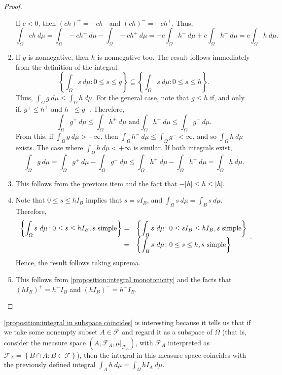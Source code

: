 \begin{proof}
\begin{enumerate}
		If \(c<0\), then \((ch)^+=-ch^-\) and \((ch)^-=-ch^+\). Thus, 
		\[\int_{\Omega}ch~d\mu=\int_{\Omega}-ch^-~d\mu-\int_{\Omega}-ch^+~d\mu=-c\int_{\Omega}h^-~d\mu+c\int_{\Omega}h^+~d\mu=c\int_{\Omega}h~d\mu.\]
		\item If \(g\) is nonnegative, then \(h\) is nonnegative too. The result
follows immediately from the definition of the integral:
		\[\left\{\int_{\Omega}s~d\mu\colon 0\leq s\leq g\right\}\subseteq\left\{\int_{\Omega}s~d\mu\colon 0\leq s\leq h\right\}.\]
Thus, \(\int_{\Omega}g~d\mu\leq\int_{\Omega}h~d\mu.\) For the general case, note
that \(g\leq h\) if, and only if, \(g^+\leq h^+\) and \(h^-\leq g^-\).
Therefore,
		\[\int_{\Omega}g^+~d\mu\leq\int_{\Omega}h^+~d\mu\text{ and
}\int_{\Omega}h^-~d\mu\leq\int_{\Omega}g^-~d\mu.\] From this, if
\(\int_{\Omega}g~d\mu>-\infty\), then
\(\int_{\Omega}h^-~d\mu\leq \int_{\Omega}g^-<\infty\), and so
\(\int_{\Omega}h~d\mu\) exists. The case where \(\int_{\Omega}h~d\mu<+\infty\)
is similar. If both integrals exist,
		\[\int_{\Omega}g~d\mu=\int_{\Omega}g^+~d\mu-\int_{\Omega}g^-~d\mu\leq\int_{\Omega}h^+~d\mu-\int_{\Omega}h^-~d\mu=\int_{\Omega}h~d\mu.\]
		\item This follows from the previous item and the fact that
\(-|h|\leq h\leq|h|\).
		\item Note that \(0\leq s\leq hI_B\) implies that \(s=sI_{B}\), and
\(\int_{\Omega}s~d\mu=\int_{B}s~d\mu\). Therefore,
		\[
		\begin{array}{>{\displaystyle}r>{\displaystyle}l} \left\{\int_{\Omega}s~d\mu\colon 0\leq s\leq hI_B , s \text{
simple}\right\}=&\left\{\int_{B}s~d\mu\colon 0\leq sI_B\leq hI_B , s \text{
simple}\right\}\\ =&\left\{\int_Bs~d\mu\colon 0\leq s\leq h , s \text{
simple}\right\}
		\end{array} .\] Hence, the result follows taking suprema.
		\item This follows from \ref{proposition:integral monotonicity} and the
facts that \((hI_B)^+=h^+I_B\) and \((hI_B)^-=h^-I_B\).
	\end{enumerate}
\end{proof}
\begin{remk}\label{remark:subspace of a measure space has the same integral}
\cref{proposition:integral in subspace coincides} is interesting because
it tells us that if we take some nonempty subset \(A\in\mathcal{F}\) and regard it as a
subspace of \(\Omega\) (that is, consider the measure space
\(\left(A,\mathcal{F}_{A},\mu|_{\mathcal{F}_{A}}\right)\), with \(\mathcal{F}_{A}\) interpreted as
\(\mathcal{F}_{A}=\left\{B\cap A\colon B\in\mathcal{F}\right\}\)), then the integral in this
measure space coincides with the previously defined integral
\(\int_{A}h~d\mu=\int_{\Omega}hI_A~d\mu\).
\end{remk}

